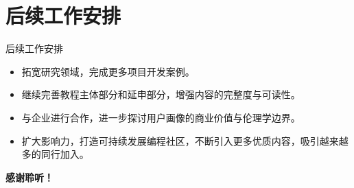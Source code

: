 \documentclass[10pt]{beamer}
\begin{document}

\section{后续工作安排}
\begin{frame}{后续工作安排}
  \begin{itemize}
    \item 拓宽研究领域，完成更多项目开发案例。\newline
    \item 继续完善教程主体部分和延申部分，增强内容的完整度与可读性。\newline
    \item 与企业进行合作，进一步探讨用户画像的商业价值与伦理学边界。\newline
    \item 扩大影响力，打造可持续发展编程社区，不断引入更多优质内容，吸引越来越多的同行加入。
  \end{itemize}

\end{frame}



\begin{frame}
\textbf{感谢聆听！}
\end{frame}
\end{document}
